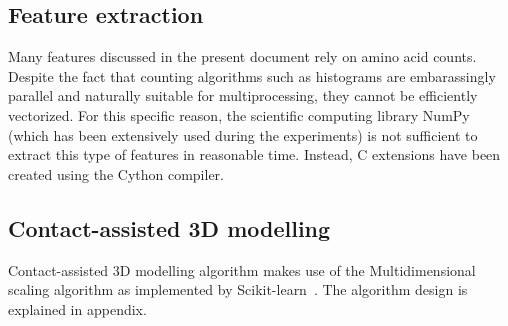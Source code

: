   \subsection{Feature extraction}

    Many features discussed in the present document rely on amino acid counts.
    Despite the fact that counting algorithms such as histograms are embarassingly parallel
    and naturally suitable for multiprocessing, they cannot be efficiently vectorized.
    For this specific reason, the scientific computing library NumPy (which has been extensively
    used during the experiments) is not sufficient to extract this type of features in reasonable
    time. Instead, C extensions have been created using the Cython compiler\cite{behnel2010cython}.

  \subsection{Contact-assisted 3D modelling}

    Contact-assisted 3D modelling algorithm makes use of the Multidimensional scaling algorithm
    as implemented by Scikit-learn~\cite{scikit-learn}.
    The algorithm design is explained in appendix.
